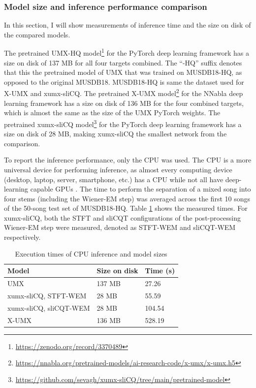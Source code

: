 \documentclass[report.tex]{subfiles}
\begin{document}
\subsubsection{Model size and inference performance comparison}
\label{sec:inferenceperf}

In this section, I will show measurements of inference time and the size on disk of the compared models.

The pretrained UMX-HQ model\footnote{\url{https://zenodo.org/record/3370489}} for the PyTorch deep learning framework has a size on disk of 137 MB for all four targets combined. The ``-HQ'' suffix denotes that this the pretrained model of UMX that was trained on MUSDB18-HQ, as opposed to the original MUSDB18. MUSDB18-HQ is same the dataset used for X-UMX and xumx-sliCQ. The pretrained X-UMX model\footnote{\url{https://nnabla.org/pretrained-models/ai-research-code/x-umx/x-umx.h5}} for the NNabla deep learning framework has a size on disk of 136 MB for the four combined targets, which is almost the same as the size of the UMX PyTorch weights. The pretrained xumx-sliCQ model\footnote{\url{https://github.com/sevagh/xumx-sliCQ/tree/main/pretrained-model}} for the PyTorch deep learning framework has a size on disk of 28 MB, making xumx-sliCQ the smallest network from the comparison.

To report the inference performance, only the CPU was used. The CPU is a more universal device for performing inference, as almost every computing device (desktop, laptop, server, smartphone, etc.) has a CPU while not all have deep-learning capable GPUs \parencite{deepcpuinf, deepcpuinf2}. The time to perform the separation of a mixed song into four stems (including the Wiener-EM step) was averaged across the first 10 songs of the 50-song test set of MUSDB18-HQ. Table \ref{table:infperf} shows the measured times. For xumx-sliCQ, both the STFT and sliCQT configurations of the post-processing Wiener-EM step were measured, denoted as STFT-WEM and sliCQT-WEM respectively.

\begin{table}[ht]
	\centering
	\caption{Execution times of CPU inference and model sizes}
	\label{table:infperf}
	\begin{tabular}{ |l|l|l| }
	 \hline
		Model & Size on disk & Time (s) \\
	 \hline
	 \hline
		UMX & 137 MB & 27.26 \\
	 \hline
		xumx-sliCQ, STFT-WEM & 28 MB & 55.59 \\
	 \hline
		xumx-sliCQ, sliCQT-WEM & 28 MB & 104.54 \\
	 \hline
		X-UMX & 136 MB & 528.19 \\
	 \hline
\end{tabular}
\end{table}
\end{document}

